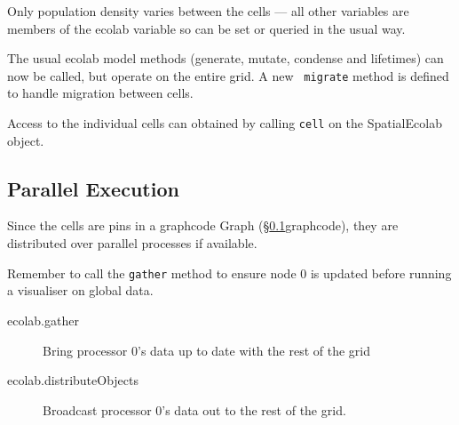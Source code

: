 \documentclass{article}
\begin{document}
Only population density varies between the cells --- all other
variables are members of the ecolab variable so can be set or queried
in the usual way.

The usual ecolab model methods (generate, mutate, condense and
lifetimes)
can now be called, but operate on the entire grid. A new {\tt
migrate} method is defined to handle migration between
cells.

Access to the individual cells can obtained by calling \verb+cell+ on
the SpatialEcolab object.

\subsection{Parallel Execution}

Since the cells are pins in a graphcode Graph (\S\ref{}{graphcode}),
they are distributed over parallel processes if available.

Remember to call the \verb+gather+ method to ensure node
0 is updated before running a visualiser on global data.

\begin{description}
\item[ecolab.gather] Bring processor 0's data up to date with the rest
  of the grid
\item[ecolab.distributeObjects] Broadcast processor 0's data out to the
  rest of the grid.
\end{description}




\end{document}
